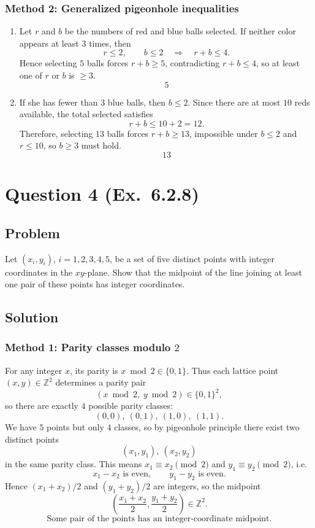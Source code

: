 \documentclass[12pt]{article}
\newcommand{\Z}{\mathbb{Z}}
\begin{document}
\subsubsection{Method 2: Generalized pigeonhole inequalities}
\begin{enumerate}[label=(\alph*)]
\item Let $r$ and $b$ be the numbers of red and blue balls selected. If neither color appears at least $3$ times, then
\[
r\le 2,\qquad b\le 2 \quad\Longrightarrow\quad r+b\le 4.
\]
Hence selecting $5$ balls forces $r+b\ge 5$, contradicting $r+b\le 4$, so at least one of $r$ or $b$ is $\ge 3$.
\[
\boxed{5}
\]

\item If she has fewer than $3$ blue balls, then $b\le 2$. Since there are at most $10$ reds available, the total selected satisfies
\[
r+b \le 10+2 = 12.
\]
Therefore, selecting $13$ balls forces $r+b\ge 13$, impossible under $b\le 2$ and $r\le 10$, so $b\ge 3$ must hold.
\[
\boxed{13}
\]
\end{enumerate}

\newpage

\section{Question 4 (Ex.\ 6.2.8)}
\subsection{Problem}
Let $(x_i,y_i)$, $i=1,2,3,4,5$, be a set of five distinct points with integer coordinates in the $xy$-plane. Show that the midpoint of the line joining at least one pair of these points has integer coordinates.

\subsection{Solution}

\subsubsection{Method 1: Parity classes modulo $2$}
For any integer $x$, its parity is $x\bmod 2\in\{0,1\}$. Thus each lattice point $(x,y)\in\Z^2$ determines a parity pair
\[
(x\bmod 2,\; y\bmod 2)\in\{0,1\}^2,
\]
so there are exactly $4$ possible parity classes:
\[
(0,0),\ (0,1),\ (1,0),\ (1,1).
\]
We have $5$ points but only $4$ classes, so by pigeonhole principle there exist two distinct points
\[
(x_1,y_1),\ (x_2,y_2)
\]
in the same parity class. This means $x_1\equiv x_2\pmod 2$ and $y_1\equiv y_2\pmod 2$, i.e.
\[
x_1-x_2\text{ is even},\qquad y_1-y_2\text{ is even}.
\]
Hence $(x_1+x_2)/2$ and $(y_1+y_2)/2$ are integers, so the midpoint
\[
\left(\frac{x_1+x_2}{2},\frac{y_1+y_2}{2}\right)\in\Z^2.
\]
\[
\boxed{\text{Some pair of the points has an integer-coordinate midpoint.}}
\]
\end{document}

